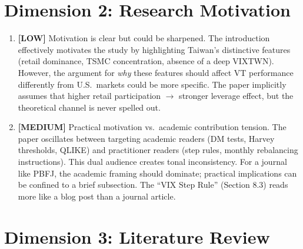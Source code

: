 \documentclass[12pt,a4paper]{article}
\newcommand{\MEDIUM}[1]{\textcolor{warncolor}{\textbf{[MEDIUM]} #1}}
\newcommand{\LOW}[1]{\textcolor{infocolor}{\textbf{[LOW]} #1}}
\begin{document}
\section{Dimension 2: Research Motivation}

\begin{enumerate}[leftmargin=2em]

\item \LOW{Motivation is clear but could be sharpened.} The introduction effectively motivates the study by highlighting Taiwan's distinctive features (retail dominance, TSMC concentration, absence of a deep VIXTWN). However, the argument for \textit{why} these features should affect VT performance differently from U.S.\ markets could be more specific. The paper implicitly assumes that higher retail participation $\to$ stronger leverage effect, but the theoretical channel is never spelled out.

\item \MEDIUM{Practical motivation vs.\ academic contribution tension.} The paper oscillates between targeting academic readers (DM tests, Harvey thresholds, QLIKE) and practitioner readers (step rules, monthly rebalancing instructions). This dual audience creates tonal inconsistency. For a journal like PBFJ, the academic framing should dominate; practical implications can be confined to a brief subsection. The ``VIX Step Rule'' (Section 8.3) reads more like a blog post than a journal article.

\end{enumerate}

\section{Dimension 3: Literature Review}
\end{document}
